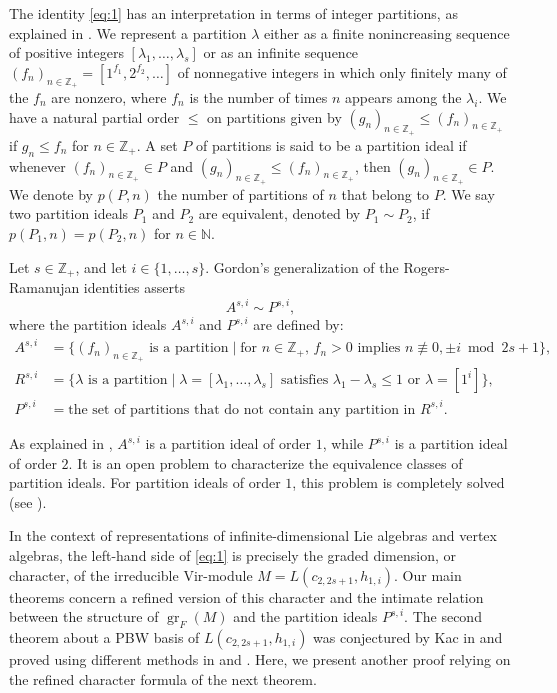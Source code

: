 \documentclass[a4paper, 12pt, reqno]{amsart}
\theoremstyle{remark}
\DeclareMathOperator{\gr}{gr}
\newcommand{\Vir}{{\mathrm{Vir}}}
\begin{document}
The identity \eqref{eq:1} has an interpretation in terms of integer partitions, as explained in \cite[\S8]{andrews_theory_1998}.
We represent a partition $\lambda$ either as a finite nonincreasing sequence of positive integers $[\lambda_1, \dots, \lambda_s]$ or as an infinite sequence $(f_n)_{n \in \mathbb{Z}_+} = [1^{f_1}, 2^{f_2}, \dots]$ of nonnegative integers in which only finitely many of the $f_n$ are nonzero, where $f_n$ is the number of times $n$ appears among the $\lambda_i$.
We have a natural partial order $\le$ on partitions given by $(g_n)_{n \in \mathbb{Z}_+} \le (f_n)_{n \in \mathbb{Z}_+}$ if $g_n \le f_n$ for $n \in \mathbb{Z}_+$.
A set $P$ of partitions is said to be a partition ideal if whenever $(f_n)_{n \in \mathbb{Z}_+} \in P$ and $(g_n)_{n \in \mathbb{Z}_+} \le (f_n)_{n \in \mathbb{Z}_+}$, then $(g_n)_{n \in \mathbb{Z}_+} \in P$.
We denote by $p(P, n)$ the number of partitions of $n$ that belong to $P$.
We say two partition ideals $P_1$ and $P_2$ are equivalent, denoted by $P_1 \sim P_2$, if $p(P_1, n) = p(P_2, n)$ for $n \in \mathbb{N}$.

Let $s \in \mathbb{Z}_+$, and let $i \in \{1, \dots, s\}$.
Gordon's generalization of the Rogers-Ramanujan identities asserts
\begin{equation*}
  A^{s, i} \sim P^{s, i},
\end{equation*}
where the partition ideals $A^{s, i}$ and $P^{s, i}$ are defined by:
\begin{align*}
  A^{s, i} &= \{\text{$(f_n)_{n \in \mathbb{Z}_+}$ is a partition} \mid \text{for $n \in \mathbb{Z}_+$, $f_n > 0$ implies $n \not\equiv 0, \pm i \bmod 2s + 1$}\}, \\
  R^{s, i} &= \{\text{$\lambda$ is a partition} \mid \text{$\lambda = [\lambda_1, \dots, \lambda_s]$ satisfies $\lambda_1 - \lambda_s \le 1$ or $\lambda = [1^i]$}\}, \\
  P^{s, i} &= \text{the set of partitions that do not contain any partition in $R^{s, i}$}.
\end{align*}

As explained in \cite[\S8]{andrews_theory_1998}, $A^{s, i}$ is a partition ideal of order $1$, while $P^{s, i}$ is a partition ideal of order $2$.
It is an open problem to characterize the equivalence classes of partition ideals.
For partition ideals of order $1$, this problem is completely solved (see \cite[Theorem 8.4]{andrews_theory_1998}).

In the context of representations of infinite-dimensional Lie algebras and vertex algebras, the left-hand side of \eqref{eq:1} is precisely the graded dimension, or character, of the irreducible $\Vir$-module $M = L(c_{2, 2s + 1}, h_{1, i})$.
Our main theorems concern a refined version of this character and the intimate relation between the structure of $\gr_F(M)$ and the partition ideals $P^{s, i}$.
The second theorem about a PBW basis of $L(c_{2, 2s + 1}, h_{1, i})$ was conjectured by Kac in \cite{kac_modular_1988} and proved using different methods in \cite{feigin_annihilating_1992} and \cite{feigin_coinvariants_1993}.
Here, we present another proof relying on the refined character formula of the next theorem.
\end{document}

